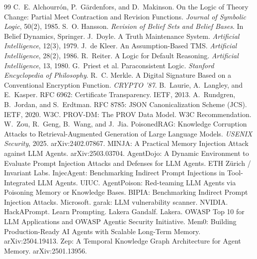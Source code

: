 \documentclass[11pt]{article}
\begin{document}
\begin{thebibliography}{99}
\small
{} C.~E. Alchourr\'on, P.~G\"ardenfors, and D.~Makinson. On the Logic of Theory Change: Partial Meet Contraction and Revision Functions. \emph{Journal of Symbolic Logic}, 50(2), 1985.
 S.~O. Hansson. \emph{Revision of Belief Sets and Belief Bases}. In Belief Dynamics, Springer.
 J.~Doyle. A Truth Maintenance System. \emph{Artificial Intelligence}, 12(3), 1979.
 J.~de Kleer. An Assumption-Based TMS. \emph{Artificial Intelligence}, 28(2), 1986.
 R.~Reiter. A Logic for Default Reasoning. \emph{Artificial Intelligence}, 13, 1980.
 G.~Priest et al. Paraconsistent Logic. \emph{Stanford Encyclopedia of Philosophy}.
 R.~C. Merkle. A Digital Signature Based on a Conventional Encryption Function. \emph{CRYPTO '87}.
 B.~Laurie, A.~Langley, and E.~Kasper. RFC 6962: Certificate Transparency. IETF, 2013.
 A.~Rundgren, B.~Jordan, and S.~Erdtman. RFC 8785: JSON Canonicalization Scheme (JCS). IETF, 2020.
 W3C. PROV-DM: The PROV Data Model. W3C Recommendation.
 W.~Zou, R.~Geng, B.~Wang, and J.~Jia. PoisonedRAG: Knowledge Corruption Attacks to Retrieval-Augmented Generation of Large Language Models. \emph{USENIX Security}, 2025. arXiv:2402.07867.
 MINJA: A Practical Memory Injection Attack against LLM Agents. arXiv:2503.03704.
 AgentDojo: A Dynamic Environment to Evaluate Prompt Injection Attacks and Defenses for LLM Agents. ETH Z\"urich / Invariant Labs.
 InjecAgent: Benchmarking Indirect Prompt Injections in Tool-Integrated LLM Agents. UIUC.
 AgentPoison: Red-teaming LLM Agents via Poisoning Memory or Knowledge Bases.
 BIPIA: Benchmarking Indirect Prompt Injection Attacks. Microsoft.
 garak: LLM vulnerability scanner. NVIDIA.
 HackAPrompt. Learn Prompting.
 Lakera Gandalf. Lakera.
 OWASP Top 10 for LLM Applications and OWASP Agentic Security Initiative.
 Mem0: Building Production-Ready AI Agents with Scalable Long-Term Memory. arXiv:2504.19413.
 Zep: A Temporal Knowledge Graph Architecture for Agent Memory. arXiv:2501.13956.
\end{thebibliography}
\end{document}
